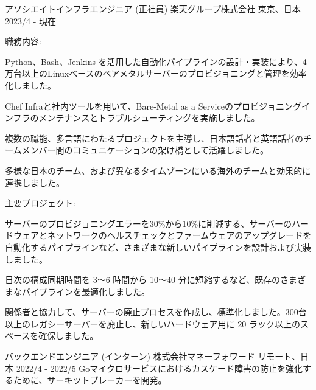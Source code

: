 

\begin{cventries}

  \cventry
    {アソシエイトインフラエンジニア (正社員)} %
    {楽天グループ株式会社} %
    {東京、日本} %
    {2023/4 - 現在} %
    {
        職務内容:
        \begin{cvbullets}
        \item Python、Bash、Jenkins を活用した自動化パイプラインの設計・実装により、4万台以上のLinuxベースのベアメタルサーバーのプロビジョニングと管理を効率化しました。
        \item Chef Infraと社内ツールを用いて、Bare-Metal as a Serviceのプロビジョニングインフラのメンテナンスとトラブルシューティングを実施しました。
        \item 複数の職能、多言語にわたるプロジェクトを主導し、日本語話者と英語話者のチームメンバー間のコミュニケーションの架け橋として活躍しました。
        \item 多様な日本のチーム、および異なるタイムゾーンにいる海外のチームと効果的に連携しました。
        \end{cvbullets}
        主要プロジェクト:
        \begin{cvbullets}
        \item サーバーのプロビジョニングエラーを30\%から10\%に削減する、サーバーのハードウェアとネットワークのヘルスチェックとファームウェアのアップグレードを自動化するパイプラインなど、さまざまな新しいパイプラインを設計および実装しました。
        \item 日次の構成同期時間を 3～6 時間から 10～40 分に短縮するなど、既存のさまざまなパイプラインを最適化しました。
        \item 関係者と協力して、サーバーの廃止プロセスを作成し、標準化しました。300台以上のレガシーサーバーを廃止し、新しいハードウェア用に 20 ラック以上のスペースを確保しました。
        \end{cvbullets}
    }

  \cventry
    {バックエンドエンジニア (インターン)} %
    {株式会社マネーフォワード} %
    {リモート、日本} %
    {2022/4 - 2022/5} %
    {
        Goマイクロサービスにおけるカスケード障害の防止を強化するために、サーキットブレーカーを開発。
    }


\end{cventries}
